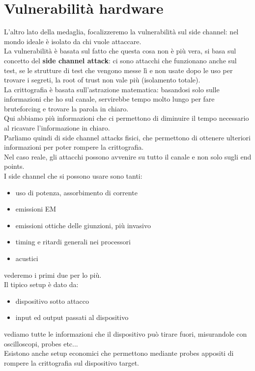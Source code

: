 \documentclass[oneside, 12pt]{extbook}
\begin{document}
\section{Vulnerabilità hardware}
L'altro lato della medaglia, focalizzeremo la vulnerabilità sul side channel: nel mondo ideale è isolato da chi vuole attaccare.
\\La vulnerabilità è basata sul fatto che questa cosa non è più vera, si basa sul concetto del \textbf{side channel attack}: ci sono attacchi che funzionano anche sul test, se le strutture di test che vengono messe lì e non usate dopo le uso per trovare i segreti, la root of trust non vale più (isolamento totale).
\\La crittografia è basata sull'astrazione matematica: basandosi solo sulle informazioni che ho sul canale, servirebbe tempo molto lungo per fare bruteforcing e trovare la parola in chiaro.
\\Qui abbiamo più informazioni che ci permettono di diminuire il tempo necessario al ricavare l'informazione in chiaro.
\\Parliamo quindi di side channel attacks fisici, che permettono di ottenere ulteriori informazioni per poter rompere la crittografia.
\\Nel caso reale, gli attacchi possono avvenire su tutto il canale e non solo sugli end points.
\\I side channel che si possono usare sono tanti:
\begin{itemize}
	\item uso di potenza, assorbimento di corrente
	\item emissioni EM
	\item emissioni ottiche delle giunzioni, più invasivo
	\item timing e ritardi generali nei processori
	\item acustici
\end{itemize}
vederemo i primi due per lo più.
\\Il tipico setup è dato da:
\begin{itemize}
	\item dispositivo sotto attacco
	\item input ed output passati al dispositivo
\end{itemize}
vediamo tutte le informazioni che il dispositivo può tirare fuori, misurandole con oscilloscopi, probes etc...
\\Esistono anche setup economici che permettono mediante probes appositi di rompere la crittografia sul dispositivo target.
\end{document}
